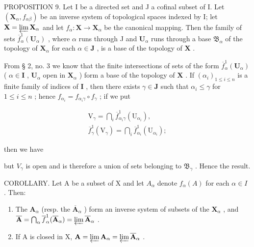 PROPOSITION 9. Let I be a directed set and J a cofinal subset of I. Let \((\mathbf{X}_{\alpha}, f_{\alpha \beta})\) be an inverse system of topological spaces indexed by I; let \(\mathbf{X} = \varprojlim \mathbf{X}_{\alpha}\) and let \(f_{\alpha}: \mathbf{X} \to \mathbf{X}_{\alpha}\) be the canonical mapping. Then the family of sets \(\overline{f}_{\alpha}^{1}(\mathbf{U}_{\alpha})\) , where \(\alpha\) runs through J and \(\mathbf{U}_{\alpha}\) runs through a base \(\mathfrak{B}_{\alpha}\) of the topology of \(\mathbf{X}_{\alpha}\) for each \(\alpha \in \mathbf{J}\) , is a base of the topology of \(\mathbf{X}\) .

From § 2, no. 3 we know that the finite intersections of sets of the form \(\overline{f}_{\alpha}^{1}(\mathbf{U}_{\alpha})\) ( \(\alpha \in \mathbf{I}\) , \(\mathbf{U}_{\alpha}\) open in \(\mathbf{X}_{\alpha}\) ) form a base of the topology of \(\mathbf{X}\) . If \((\alpha_i)_{1 \leqslant i \leqslant n}\) is a finite family of indices of \(\mathbf{I}\) , then there exists \(\gamma \in \mathbf{J}\) such that \(\alpha_i \leqslant \gamma\) for \(1 \leqslant i \leqslant n\) ; hence \(f_{\alpha_i} = f_{\alpha_i \gamma} \circ f_\gamma\) ; if we put

\[
\begin{array}{c} \mathrm{V} _ {\gamma} = \bigcap_ {i} \overline {{f}} _ {\alpha_ {i} \gamma} ^ {1} (\mathrm{U} _ {\alpha_ {i}}), \\ \overline {{f}} _ {\gamma} ^ {1} (\mathrm{V} _ {\gamma}) = \bigcap_ {i} \overline {{f}} _ {\alpha_ {i}} ^ {1} (\mathrm{U} _ {\alpha_ {i}}); \end{array}
\]

then we have

but \(V_{\gamma}\) is open and is therefore a union of sets belonging to \(\mathfrak{B}_{\gamma}\) . Hence the result.

COROLLARY. Let A be a subset of X and let \(A_{\alpha}\) denote \(f_{\alpha}(A)\) for each \(\alpha \in I\) . Then:

\begin{enumerate}
\def\labelenumi{(\roman{enumi})}
\item
  The \(\mathbf{A}_{\alpha}\) (resp. the \(\overline{\mathbf{A}}_{\alpha}\) ) form an inverse system of subsets of the \(\mathbf{X}_{\alpha}\) , and \(\overline{\mathbf{A}} = \bigcap_{\alpha} \overline{f}_{\alpha}^{1}(\overline{\mathbf{A}}_{\alpha}) = \varprojlim \overline{\mathbf{A}}_{\alpha}\) .
\item
  If A is closed in X, \(\mathbf{A} = \varprojlim \mathbf{A}_{\alpha} = \varprojlim \overline{\mathbf{A}}_{\alpha}\) .
\end{enumerate}

